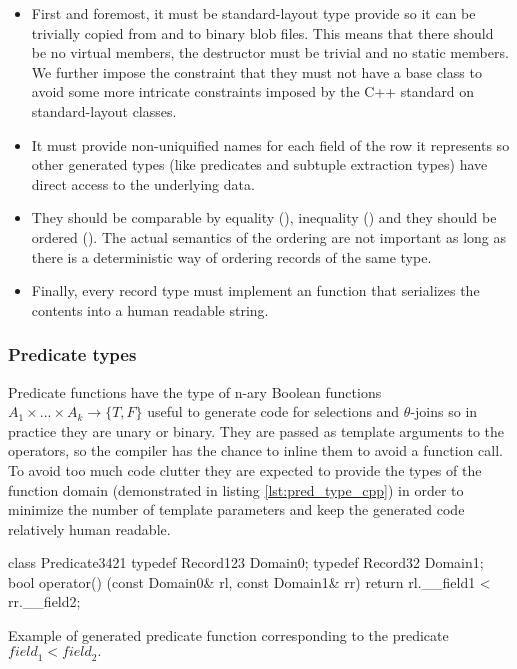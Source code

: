 \begin{itemize}
\item First and foremost, it must be standard-layout type provide so it can
be trivially copied from and to binary blob files. This means that
there should be no virtual members, the destructor must be trivial
and no static members. We further impose the constraint that they
must not have a base class to avoid some more intricate constraints
imposed by the C++ standard on standard-layout classes.
\item It must provide non-uniquified names for each field of the row it
represents so other generated types (like predicates and subtuple
extraction types) have direct access to the underlying data.
\item They should be comparable by equality (\cpp{==}), inequality (\cpp{!=}) and
they should be ordered (\cpp{<}). The actual semantics of the ordering
are not important as long as there is a deterministic way of
ordering records of the same type.
\item Finally, every record type must implement an  function that serializes the contents into a human readable
string.
\end{itemize}

\subsubsection{Predicate types}

Predicate functions have the type of n-ary Boolean functions \(A_1
\times ... \times A_k \to \{T,F\}\) useful to generate code for selections and
\(\theta\)-joins so in practice they are unary or binary. They are
passed as template arguments to the operators, so the compiler has the
chance to inline them to avoid a function call. To avoid too much code
clutter they are expected to provide the types of the function domain
(demonstrated in listing \ref{lst:pred_type_cpp}) in order to minimize
the number of template parameters and keep the generated code
relatively human readable.

\begin{code}
\begin{cppcode}
class Predicate3421 {
  typedef Record123 Domain0;
  typedef Record32 Domain1;
  bool operator() (const Domain0& rl, const Domain1& rr) {
    return rl.__field1 < rr.__field2;
  }
}
\end{cppcode}
\caption{\label{lst:pred_type_cpp}Example of generated predicate function corresponding to the predicate \(\mathit{field}_1 < \mathit{field}_2.\)}
\end{code}

